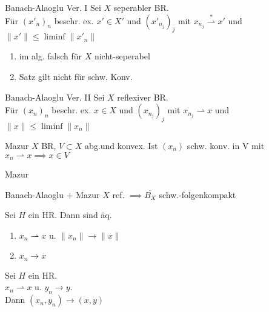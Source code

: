 \begin{satz}{Banach-Alaoglu Ver. I}
    Sei \(X\) seperabler BR.\\ Für \((x'_n)_n\) beschr. ex. \(x'\in X'\) und
    \((x'_{n_j})_j\) mit \(x_{n_j} \stackrel{*}{\rightharpoonup} x'\) und
    \(\|x'\| \leq \liminf \|x'_n\|\)
\end{satz}

\begin{bemerkung}
    \begin{enumerate}
        \item im alg. falsch für \(X\) nicht-seperabel
        \item Satz gilt nicht für schw. Konv.
    \end{enumerate}
\end{bemerkung}

\begin{satz}{Banach-Alaoglu Ver. II}
    Sei \(X\) reflexiver BR.\\ Für \((x_n)_n\) beschr. ex. \(x\in X\) und
    \((x_{n_j})_j\) mit \(x_{n_j} \rightharpoonup x\) und
    \(\|x\| \leq \liminf \|x_n\|\)
\end{satz}

\begin{satz}{Mazur}
    \(X\) BR, \(V\subset X\) abg.und konvex. Ist \((x_n)\) schw. konv. in V mit
    \(x_n \rightharpoonup x \implies x \in V\)
\end{satz}{Mazur}

\begin{satz}{Banach-Alaoglu + Mazur}
    \(X\) ref. \(\implies \overline{B_X}\) schw.-folgenkompakt
\end{satz}

\begin{bemerkung}
    Sei \(H\) ein HR. Dann sind äq.
    \begin{enumerate}[label = (\roman*)]
        \item \(x_n \rightharpoonup x\) u. \(\|x_n\| \to \|x\|\)
        \item \(x_n \to x\)
    \end{enumerate}
    
\end{bemerkung}

\begin{bemerkung}
    Sei \(H\) ein HR.\\
    \(x_n \rightharpoonup x\) u. \(y_n \to y\).\\
    Dann \((x_n,y_n) \to (x,y)\)
\end{bemerkung}